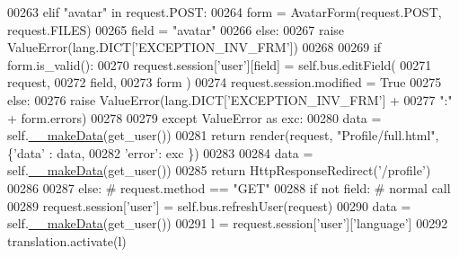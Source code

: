 \begin{DoxyCode}
00263                 \textcolor{keywordflow}{elif} \textcolor{stringliteral}{"avatar"} \textcolor{keywordflow}{in} request.POST:
00264                     form = AvatarForm(request.POST, request.FILES)
00265                     field = \textcolor{stringliteral}{"avatar"}
00266                 \textcolor{keywordflow}{else}:
00267                     \textcolor{keywordflow}{raise} ValueError(lang.DICT[\textcolor{stringliteral}{'EXCEPTION\_INV\_FRM'}])
00268 
00269                 \textcolor{keywordflow}{if} form.is\_valid():
00270                     request.session[\textcolor{stringliteral}{'user'}][field] = self.bus.editField(
00271                                                         request, 
00272                                                         field, 
00273                                                         form )
00274                     request.session.modified = \textcolor{keyword}{True}
00275                 \textcolor{keywordflow}{else}:
00276                     \textcolor{keywordflow}{raise} ValueError(lang.DICT[\textcolor{stringliteral}{'EXCEPTION\_INV\_FRM'}] + 
00277                         \textcolor{stringliteral}{":"} + form.errors)
00278 
00279             \textcolor{keywordflow}{except} ValueError \textcolor{keyword}{as} exc:
00280                 data = self.\hyperlink{classProfile_1_1ProfileUnit_1_1UiFullProfile_ae0e9c54df37ab45f0d1c5d894181d10f}{\_\_makeData}(get\_user())
00281                 \textcolor{keywordflow}{return} render(request, \textcolor{stringliteral}{"Profile/full.html"}, \{\textcolor{stringliteral}{'data'} : data,
00282                                                              \textcolor{stringliteral}{'error'}: exc \})
00283 
00284             data = self.\hyperlink{classProfile_1_1ProfileUnit_1_1UiFullProfile_ae0e9c54df37ab45f0d1c5d894181d10f}{\_\_makeData}(get\_user())
00285             \textcolor{keywordflow}{return} HttpResponseRedirect(\textcolor{stringliteral}{'/profile'})
00286 
00287         \textcolor{keywordflow}{else}: \textcolor{comment}{# request.method == "GET"}
00288             \textcolor{keywordflow}{if} \textcolor{keywordflow}{not} field: \textcolor{comment}{# normal call}
00289                 request.session[\textcolor{stringliteral}{'user'}] = self.bus.refreshUser(request)
00290                 data = self.\hyperlink{classProfile_1_1ProfileUnit_1_1UiFullProfile_ae0e9c54df37ab45f0d1c5d894181d10f}{\_\_makeData}(get\_user())
00291                 l = request.session[\textcolor{stringliteral}{'user'}][\textcolor{stringliteral}{'language'}]
00292                 translation.activate(l)

\end{DoxyCode}
